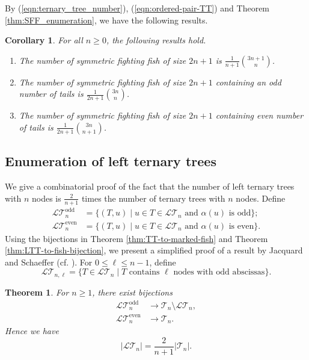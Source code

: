 \documentclass[a4paper,11pt,reqno]{amsart}
\newtheorem{thm}[lem]{Theorem}
\newtheorem{cor}[lem]{Corollary}
\theoremstyle{definition}
\numberwithin{equation}{section}
\newcommand{\LT}{{\mathcal{LT}}}
\newcommand{\T}{{\mathcal{T}}}
\newcommand{\odd}{{\textrm{odd}}}
\newcommand{\even}{{\textrm{even}}}
\begin{document}
By (\ref{eqn:ternary_tree_number}), (\ref{eqn:ordered-pair-TT}) and Theorem \ref{thm:SFF_enumeration}, we have the following results. 

\begin{cor} \label{cor:symmetric-FF-enumeration}
For all $n\ge 0$, the following results hold.
\begin{enumerate}
\item The number of symmetric fighting fish of size $2n+1$ is $\frac{1}{n+1}\binom{3n+1}{n}$.
\item The number of symmetric fighting fish of size $2n+1$ containing an odd number of tails is $\frac{1}{2n+1}\binom{3n}{n}$.
\item The number of symmetric fighting fish of size $2n+1$ containing even number of tails is $\frac{1}{2n+1}\binom{3n}{n+1}$.
\end{enumerate}
\end{cor}





\subsection{Enumeration of left ternary trees}
We give a combinatorial proof of the fact that the number of left ternary trees with $n$ nodes is $\frac{2}{n+1}$ times the number of ternary trees with $n$ nodes. Define
\begin{align*}
\LT_n^{\odd} &= \{(T,u)\mid u\in T\in\LT_n\mbox{ and $\alpha(u)$ is odd}\}; \\
\LT_n^{\even} &=\{(T,u)\mid u\in T\in\LT_n\mbox{ and $\alpha(u)$ is even}\}.
\end{align*}
Using the bijections in Theorem \ref{thm:TT-to-marked-fish} and Theorem \ref{thm:LTT-to-fish-bijection}, we present a simplified proof of a result by Jacquard and Schaeffer (cf. \cite[Theorem 2]{JS-1998}). For $0\le \ell\le n-1$, define
\begin{equation}
\LT_{n,\ell} = \{T\in\LT_n\mid\mbox{$T$ contains $\ell$ nodes with odd abscissas}\}.
\end{equation}



\begin{thm} \label{thm:enumeration}
For $n\ge 1$, there exist bijections
\begin{align}
\LT_n^{\odd} & \rightarrow \T_n\setminus \LT_n,  \label{eqn:LT_odd}\\
\LT_n^{\even}& \rightarrow \T_n. \label{eqn:LT_even}
\end{align}
Hence we have 
\begin{equation*}
|\LT_n| =\frac{2}{n+1} |\T_n|.
\end{equation*}
\end{thm}
\end{document}
